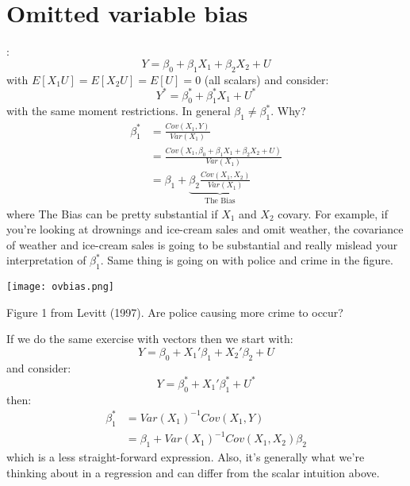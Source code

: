 \documentclass{tufte-book}
\theoremstyle{mytheoremstyle}
\theoremstyle{mylemstyle}
\theoremstyle{mydefstyle}
\begin{document}
\section{Omitted variable bias}
:
	\[Y = \beta_0 + \beta_1X_1 + \beta_2X_2 + U\]
with \(E[X_1 U] = E[X_2U] = E[U] = 0\) (all scalars) and consider: 
	\[Y^* = \beta^*_0 + \beta^*_1 X_1 + U^*\]
with the same moment restrictions. In general \(\beta_1 \ne \beta_1^*\). Why?
	\begin{align*}
		\beta_1^* & = \frac{Cov(X_1, Y)}{Var(X_1)} \\
				& = \frac{Cov(X_1, \beta_0 + \beta_1X_1 + \beta_2 X_2 + U)}{Var(X_1)} \\
				& = \beta_1 + \underbrace{\beta_2 \frac{Cov(X_1, X_2)}{Var(X_1)}}_\textrm{The Bias}
	\end{align*}
where The Bias can be pretty substantial if \(X_1\) and \(X_2\) covary. For example, if you're looking at drownings and ice-cream sales and omit weather, the covariance of weather and ice-cream sales is going to be substantial and really mislead your interpretation of \(\beta_1^*\). Same thing is going on with police and crime in the figure.\begin{marginfigure} \texttt{[image: ovbias.png]} \caption{Figure 1 from Levitt (1997). Are police causing more crime to occur?} \end{marginfigure}

If we do the same exercise with vectors then we start with:
	\[Y = \beta_0 + X_1'\beta_1 + X_2'\beta_2 + U\]
and consider:
	\[Y = \beta_0^* + X_1'\beta_1^* + U^*\]
then:
	\begin{align*}
		\beta_1^* & = Var(X_1)^{-1}Cov(X_1, Y) \\
				& = \beta_1 + Var(X_1)^{-1}Cov(X_1, X_2)\beta_2
	\end{align*}
which is a less straight-forward expression. Also, it's generally what we're thinking about in a regression and can differ from the scalar intuition above.
\end{document}
